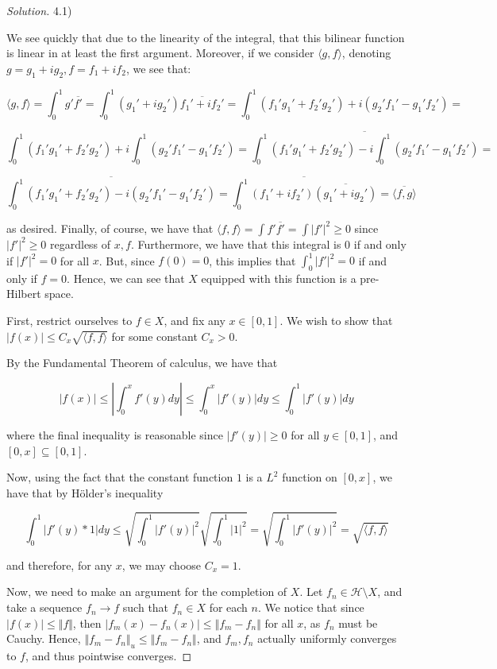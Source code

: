 \documentclass[10pt]{article}
\begin{document}
\begin{proof}[Solution]

4.1)

We see quickly that due to the linearity of the integral, that this bilinear function is linear in at least the first argument. Moreover, if we consider $\langle g, f \rangle$, denoting $g = g_1 + i g_2, f = f_1 + i f_2$, we see that:

$$ \langle g, f \rangle = \int_0^1 g' \overline{f'} = \int_0^1 (g_1' + i g_2') \overline{f_1' + i f_2'} = \int_0^1 (f_1' g_1' + f_2' g_2') + i(g_2' f_1' - g_1' f_2') =$$

$$ \int_0^1 (f_1' g_1' + f_2' g_2')   + i \int_0^1 (g_2' f_1' - g_1' f_2') = \overline{  \int_0^1 (f_1' g_1' + f_2' g_2')   - i \int_0^1 (g_2' f_1' - g_1' f_2') } = $$

$$\overline{ \int_0^1  (f_1' g_1' + f_2' g_2')   - i (g_2' f_1' - g_1' f_2') } =\overline{\int_0^1 (f_1' + i f_2') \overline{(g_1' + i g_2')}  } = \overline{ \langle f, g \rangle }$$

as desired. Finally, of course, we have that $\langle f, f \rangle = \int f' \overline{f'} = \int |f'|^2 \geq 0 $ since $|f'|^2 \geq 0$ regardless of $x, f$. Furthermore, we have that this integral is 0 if and only if $|f'|^2 = 0$ for all $x$. But, since $f(0) = 0$, this implies that $\int_0^1 |f'|^2 =  0$ if and only if $f = 0$. Hence, we can see that $X$ equipped with this function is a pre-Hilbert space.

First, restrict ourselves to $f \in X$, and fix any $x \in [0,1]$. We wish to show that $|f(x)| \leq C_x \sqrt{ \langle f, f \rangle }$ for some constant $C_x > 0$.

By the Fundamental Theorem of calculus, we have that

$$ | f(x) | \leq \left| \int_0^x f'(y) dy \right| \leq \int_0^x | f'(y)| dy \leq \int_0^1 | f'(y)| dy $$

where the final inequality is reasonable since $|f'(y)| \geq 0$ for all $y \in [0,1]$, and $[0,x] \subseteq [0,1]$.

Now, using the fact that the constant function $1$ is a $L^2$ function on $[0,x]$, we have that by H\"older's inequality

$$ \int_0^1 | f'(y) * 1| dy  \leq \sqrt{\int_0^1 |f'(y)|^2} \sqrt{\int_0^1 |1|^2} =  \sqrt{\int_0^1 |f'(y)|^2} = \sqrt{\langle f, f \rangle }$$

and therefore, for any $x$, we may choose $C_x = 1$.

Now, we need to make an argument for the completion of $X$. Let $f_n \in \mathcal{H} \setminus X$, and take a sequence $f_n \to f$ such that $f_n \in X$ for each $n$. We notice that since $|f(x)| \leq \Vert f \Vert$, then $| f_m(x) - f_n(x) | \leq \Vert f_m - f_n \Vert$ for all $x$, as $f_n$ must be Cauchy. Hence, $\Vert f_m - f_n \Vert_u \leq \Vert f_m - f_n \Vert$, and $f_m, f_n$ actually uniformly converges to $f$, and thus pointwise converges.


\end{proof}
\end{document}
